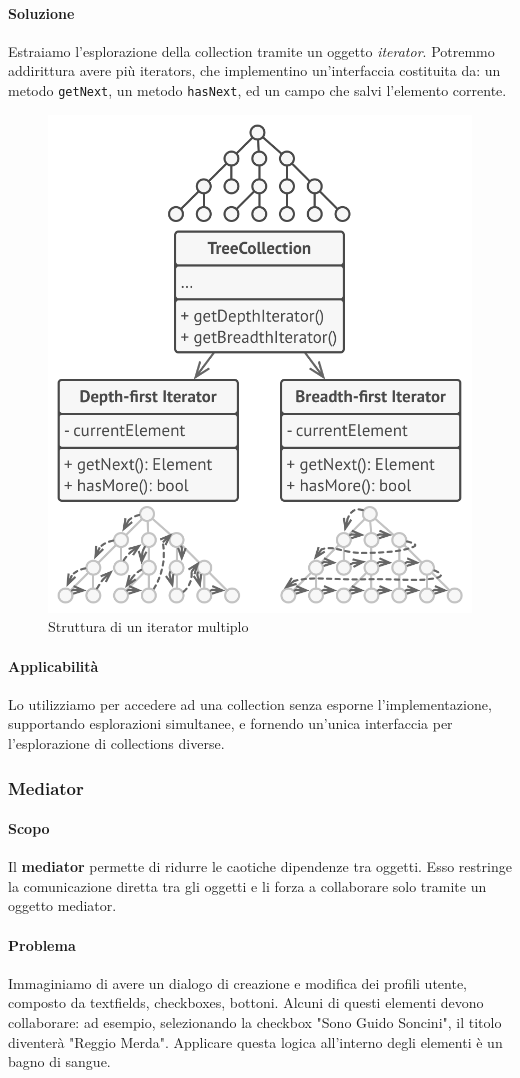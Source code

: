 \documentclass[11pt]{article}
\newcommand{\code}[1]{\texttt{#1}}
\begin{document}
\paragraph{Soluzione}
Estraiamo l'esplorazione della collection tramite un oggetto \textit{iterator}. Potremmo addirittura avere più iterators, che implementino un'interfaccia costituita da: un metodo \code{getNext}, un metodo \code{hasNext}, ed un campo che salvi l'elemento corrente. 
\begin{figure}[H]
    \centering
    \includegraphics[width=0.6\linewidth]{res/teoria/Iterator.png}
    \caption{Struttura di un iterator multiplo}
\end{figure}
\paragraph{Applicabilità}
Lo utilizziamo per accedere ad una collection senza esporne l'implementazione, supportando esplorazioni simultanee, e fornendo un'unica interfaccia per l'esplorazione di collections diverse.
\subsubsection{Mediator}
\paragraph{Scopo}
Il \textbf{mediator} permette di ridurre le caotiche dipendenze tra oggetti. Esso restringe la comunicazione diretta tra gli oggetti e li forza a collaborare solo tramite un oggetto mediator. 

\paragraph{Problema}
Immaginiamo di avere un dialogo di creazione e modifica dei profili utente, composto da textfields, checkboxes, bottoni. Alcuni di questi elementi devono collaborare: ad esempio, selezionando la checkbox "Sono Guido Soncini", il titolo diventerà "Reggio Merda". Applicare questa logica all'interno degli elementi è un bagno di sangue.
\end{document}
